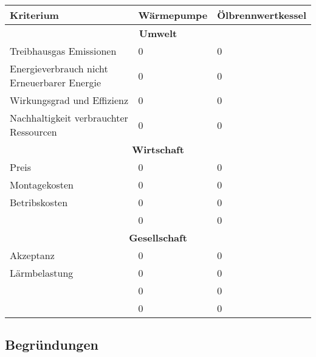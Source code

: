 \begin{center}
\begin{tabular}[c]{|p{}|p{}|p{}|}

  \hline
  \textbf{\Large{Kriterium}} &
  \textbf{\Large{Wärmepumpe}} &
  \textbf{\Large{Ölbrennwertkessel}} \\ \hline

  \multicolumn{3}{|c|}{\textbf{\Large{Umwelt}}} \\ \hline
  
  Treibhausgas Emissionen
  & 0 & 0 \\
  Energieverbrauch nicht Erneuerbarer Energie
  & 0 & 0 \\
  Wirkungsgrad und Effizienz
  & 0 & 0 \\
  Nachhaltigkeit verbrauchter Ressourcen
  & 0 & 0 \\
  \hline
  
  \multicolumn{3}{|c|}{\textbf{\Large{Wirtschaft}}} \\ \hline
  
  Preis
  & 0 & 0 \\
  Montagekosten
  & 0 & 0 \\
  Betribskosten
  & 0 & 0 \\
  
  & 0 & 0 \\
  \hline

  \multicolumn{3}{|c|}{\textbf{\Large{Gesellschaft}}} \\ \hline

  Akzeptanz
  & 0 & 0 \\
  Lärmbelastung
  & 0 & 0 \\

  & 0 & 0 \\

  & 0 & 0 \\
  \hline

\end{tabular}
\end{center}

\subsection{Begründungen}


